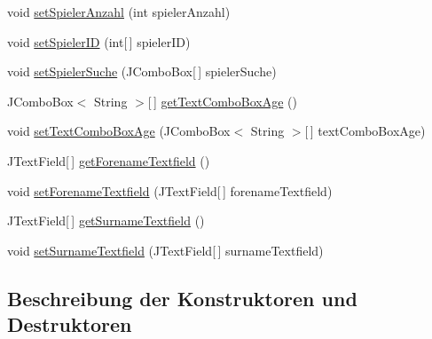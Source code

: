 \begin{DoxyCompactItemize}
\item 
void \hyperlink{classde_1_1turnierverwaltung_1_1view_1_1_new_tournament_player_input_view_ab473943e301a4327ac089cd5b1f77c4e}{set\+Spieler\+Anzahl} (int spieler\+Anzahl)
\item 
void \hyperlink{classde_1_1turnierverwaltung_1_1view_1_1_new_tournament_player_input_view_ac4bab5073c9992b820e125014297ef2e}{set\+Spieler\+ID} (int\mbox{[}$\,$\mbox{]} spieler\+ID)
\item 
void \hyperlink{classde_1_1turnierverwaltung_1_1view_1_1_new_tournament_player_input_view_a0f99b741a3f983b70e7614b6778cd23d}{set\+Spieler\+Suche} (J\+Combo\+Box\mbox{[}$\,$\mbox{]} spieler\+Suche)
\item 
J\+Combo\+Box$<$ String $>$\mbox{[}$\,$\mbox{]} \hyperlink{classde_1_1turnierverwaltung_1_1view_1_1_new_tournament_player_input_view_a447142631b152960f234c8c7a5697e1d}{get\+Text\+Combo\+Box\+Age} ()
\item 
void \hyperlink{classde_1_1turnierverwaltung_1_1view_1_1_new_tournament_player_input_view_a67127fb17eef6c0c2e6522708941c6ec}{set\+Text\+Combo\+Box\+Age} (J\+Combo\+Box$<$ String $>$\mbox{[}$\,$\mbox{]} text\+Combo\+Box\+Age)
\item 
J\+Text\+Field\mbox{[}$\,$\mbox{]} \hyperlink{classde_1_1turnierverwaltung_1_1view_1_1_new_tournament_player_input_view_a48723956c991dccd51a99a8e2aa7b9c1}{get\+Forename\+Textfield} ()
\item 
void \hyperlink{classde_1_1turnierverwaltung_1_1view_1_1_new_tournament_player_input_view_a147fc57814be174643f0008b002eb037}{set\+Forename\+Textfield} (J\+Text\+Field\mbox{[}$\,$\mbox{]} forename\+Textfield)
\item 
J\+Text\+Field\mbox{[}$\,$\mbox{]} \hyperlink{classde_1_1turnierverwaltung_1_1view_1_1_new_tournament_player_input_view_a7a489a0ef24b7625a7789904e2a344ac}{get\+Surname\+Textfield} ()
\item 
void \hyperlink{classde_1_1turnierverwaltung_1_1view_1_1_new_tournament_player_input_view_ab472bf483a36e5625ec82fa8b4c38dd1}{set\+Surname\+Textfield} (J\+Text\+Field\mbox{[}$\,$\mbox{]} surname\+Textfield)
\end{DoxyCompactItemize}


\subsection{Beschreibung der Konstruktoren und Destruktoren}
